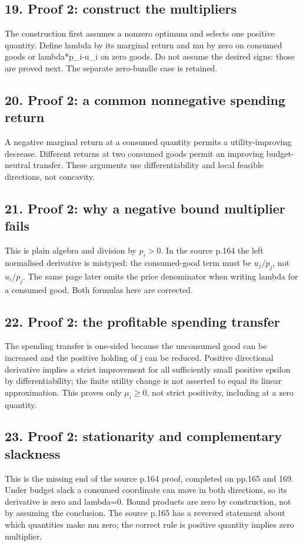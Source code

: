 \documentclass[11pt,a4paper]{article}
\begin{document}
\subsection*{19. Proof 2: construct the multipliers}
The construction first assumes a nonzero optimum and selects one positive quantity. Define lambda by its marginal return and mu by zero on consumed goods or lambda*p\_i-u\_i on zero goods. Do not assume the desired signs: those are proved next. The separate zero-bundle case is retained.

\subsection*{20. Proof 2: a common nonnegative spending return}
A negative marginal return at a consumed quantity permits a utility-improving decrease. Different returns at two consumed goods permit an improving budget-neutral transfer. These arguments use differentiability and local feasible directions, not concavity.

\subsection*{21. Proof 2: why a negative bound multiplier fails}
This is plain algebra and division by $p_i>0$. In the source p.164 the left normalised derivative is mistyped: the consumed-good term must be $u_j/p_j$, not $u_i/p_j$. The same page later omits the price denominator when writing lambda for a consumed good. Both formulas here are corrected.

\subsection*{22. Proof 2: the profitable spending transfer}
The spending transfer is one-sided because the unconsumed good can be increased and the positive holding of j can be reduced. Positive directional derivative implies a strict improvement for all sufficiently small positive epsilon by differentiability; the finite utility change is not asserted to equal its linear approximation. This proves only $\mu_i\ge0$, not strict positivity, including at a zero quantity.

\subsection*{23. Proof 2: stationarity and complementary slackness}
This is the missing end of the source p.164 proof, completed on pp.165 and 169. Under budget slack a consumed coordinate can move in both directions, so its derivative is zero and lambda=0. Bound products are zero by construction, not by assuming the conclusion. The source p.165 has a reversed statement about which quantities make mu zero; the correct rule is positive quantity implies zero multiplier.
\end{document}
